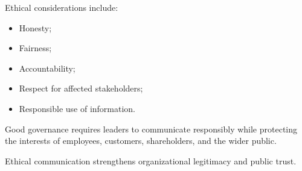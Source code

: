 \documentclass[10pt]{article}
\begin{document}
Ethical considerations include:
\begin{itemize}
    \item Honesty;
    \item Fairness;
    \item Accountability;
    \item Respect for affected stakeholders;
    \item Responsible use of information.
\end{itemize}

Good governance requires leaders to communicate responsibly while protecting the interests of employees, customers, shareholders, and the wider public.

Ethical communication strengthens organizational legitimacy and public trust.
\end{document}
